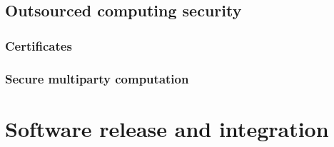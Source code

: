 \documentclass{deliverablereport}
\begin{document}
\subsection{Outsourced computing security}

\subsubsection{Certificates}
\cite{DLP17}
\cite{LNPRR18}
\subsubsection{Secure multiparty computation}

\cite{DFLLOPP18}
\section{Software release and integration}



\end{document}
